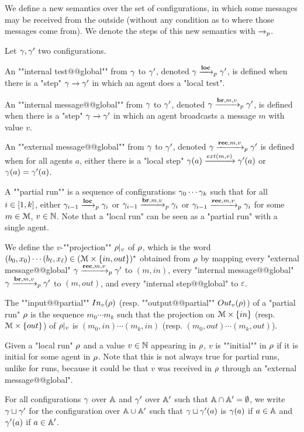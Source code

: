 We define a new semantics over the set of configurations, in which some messages may be received from the outside (without any condition as to where those messages come from). We denote the steps of this new semantics with $\xrightarrow{}_{p}$.  
\begin{definition}
	Let $\gamma, \gamma'$ two configurations. 

	An ""internal test@@global"" from $\gamma$ to $\gamma'$, denoted $\gamma \xrightarrow{\textbf{loc}}_{p} \gamma'$, is defined when there is a "step" $\gamma \xrightarrow{} \gamma'$ in which an agent does a "local test". 
	
	An ""internal message@@global"" from $\gamma$ to $\gamma'$, denoted $\gamma \xrightarrow{\textbf{br}, m, v}_{p} \gamma'$, is defined when there is a "step" $\gamma \xrightarrow{} \gamma'$ in which an agent broadcasts a message $m$ with value $v$. 
	
	An ""external message@@global"" from $\gamma$ to $\gamma'$, denoted $\gamma \xrightarrow{\textbf{rec}, m, v}_{p} \gamma'$ is defined when for all agents $a$, either there is a "local step" $\config(a) \extbr{m}{v} \config'(a)$ or $\gamma(a) = \gamma'(a)$.
	
	A ""partial run"" is a sequence of configurations $\gamma_0 \cdots \gamma_k$  such that for all $i \in [1,k]$, either $\gamma_{i-1} \xrightarrow{\textbf{loc}}_{p} \gamma_{i}$ or $\gamma_{i-1} \xrightarrow{\textbf{br}, m, v}_{p} \gamma_{i}$ or $\gamma_{i-1} \xrightarrow{\textbf{rec}, m, v}_{p} \gamma_{i}$ for some $m \in \mathcal{M}$, $v\in \mathbb{N}$. 
	Note that a "local run" can be seen as a "partial run" with a single agent.

	
	We define the $v$-""projection"" ${\rho}|_{v}$ of $\rho$, which is the word $(b_0, x_0) \cdots (b_\ell, x_\ell) \in (\mathcal{M} \times \{in, out\})^*$ obtained from $\rho$ by mapping every "external message@@global" $\gamma \xrightarrow{\textbf{rec}, m, v}_{p} \gamma'$ to $(m, in)$, every "internal message@@global" $\gamma \xrightarrow{\textbf{br}, m, v}_{p} \gamma'$ to $(m, out)$, and every "internal step@@global" to $\varepsilon$.
	
	\AP The ""input@@partial"" $\vinput{v}{\run}$ (resp. ""output@@partial"" $\voutput{v}{\run}$) of a "partial run" $\rho$ is the sequence $m_0 \cdots m_k$ such that the projection on $\mathcal{M} \times \{in\}$ (resp. $\mathcal{M}\times \{out\}$) of ${\rho}|_{v}$ is $(m_0, in) \cdots (m_k, in)$ (resp. $(m_0, out)\cdots(m_k, out)$).
	
	\AP Given a "local run" $\rho$ and a value $v \in \mathbb{N}$ appearing in $\rho$, $v$ is ""initial"" in $\rho$ if it is initial for some agent in $\rho$. Note that this is not always true for partial runs, unlike for runs, because it could be that $v$ was received in $\rho$ through an "external message@@global". 

	For all configurations $\gamma$ over $\mathbb{A}$ and $\gamma'$ over $\mathbb{A}'$ such that $\mathbb{A} \cap \mathbb{A}' = \emptyset$, we write $\gamma \sqcup \gamma'$ for the configuration over $\mathbb{A} \cup \mathbb{A}'$ such that $\gamma \sqcup \gamma'(a)$ is $\gamma(a)$ if $a \in \mathbb{A}$ and $\gamma'(a)$ if $a \in \mathbb{A}'$. 

	\end{definition}

